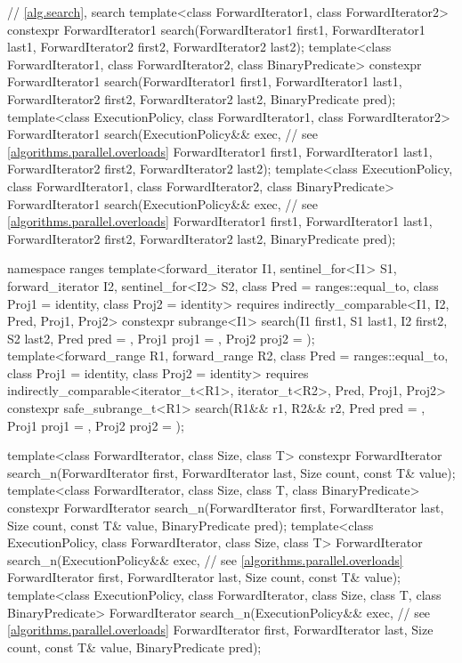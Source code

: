 \begin{codeblock}
{  // \ref{alg.search}, search
  template<class ForwardIterator1, class ForwardIterator2>
    constexpr ForwardIterator1
      search(ForwardIterator1 first1, ForwardIterator1 last1,
             ForwardIterator2 first2, ForwardIterator2 last2);
  template<class ForwardIterator1, class ForwardIterator2, class BinaryPredicate>
    constexpr ForwardIterator1
      search(ForwardIterator1 first1, ForwardIterator1 last1,
             ForwardIterator2 first2, ForwardIterator2 last2,
             BinaryPredicate pred);
  template<class ExecutionPolicy, class ForwardIterator1, class ForwardIterator2>
    ForwardIterator1
      search(ExecutionPolicy&& exec,                            // see \ref{algorithms.parallel.overloads}
             ForwardIterator1 first1, ForwardIterator1 last1,
             ForwardIterator2 first2, ForwardIterator2 last2);
  template<class ExecutionPolicy, class ForwardIterator1, class ForwardIterator2,
           class BinaryPredicate>
    ForwardIterator1
      search(ExecutionPolicy&& exec,                            // see \ref{algorithms.parallel.overloads}
             ForwardIterator1 first1, ForwardIterator1 last1,
             ForwardIterator2 first2, ForwardIterator2 last2,
             BinaryPredicate pred);

  namespace ranges {
    template<forward_iterator I1, sentinel_for<I1> S1, forward_iterator I2,
             sentinel_for<I2> S2, class Pred = ranges::equal_to,
             class Proj1 = identity, class Proj2 = identity>
      requires indirectly_comparable<I1, I2, Pred, Proj1, Proj2>
      constexpr subrange<I1>
        search(I1 first1, S1 last1, I2 first2, S2 last2, Pred pred = {},
               Proj1 proj1 = {}, Proj2 proj2 = {});
    template<forward_range R1, forward_range R2, class Pred = ranges::equal_to,
             class Proj1 = identity, class Proj2 = identity>
      requires indirectly_comparable<iterator_t<R1>, iterator_t<R2>, Pred, Proj1, Proj2>
      constexpr safe_subrange_t<R1>
        search(R1&& r1, R2&& r2, Pred pred = {},
               Proj1 proj1 = {}, Proj2 proj2 = {});
  }

  template<class ForwardIterator, class Size, class T>
    constexpr ForwardIterator
      search_n(ForwardIterator first, ForwardIterator last,
               Size count, const T& value);
  template<class ForwardIterator, class Size, class T, class BinaryPredicate>
    constexpr ForwardIterator
      search_n(ForwardIterator first, ForwardIterator last,
               Size count, const T& value,
               BinaryPredicate pred);
  template<class ExecutionPolicy, class ForwardIterator, class Size, class T>
    ForwardIterator
      search_n(ExecutionPolicy&& exec,                          // see \ref{algorithms.parallel.overloads}
               ForwardIterator first, ForwardIterator last,
               Size count, const T& value);
  template<class ExecutionPolicy, class ForwardIterator, class Size, class T,
           class BinaryPredicate>
    ForwardIterator
      search_n(ExecutionPolicy&& exec,                          // see \ref{algorithms.parallel.overloads}
               ForwardIterator first, ForwardIterator last,
               Size count, const T& value,
               BinaryPredicate pred);

}
\end{codeblock}
